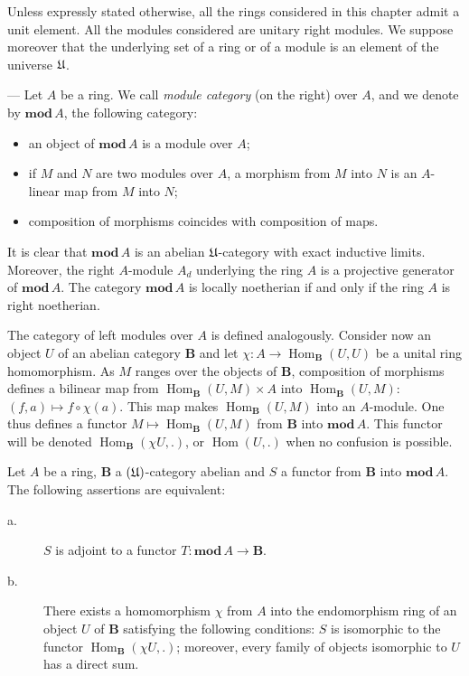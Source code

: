 Unless expressly stated otherwise, all the rings considered in this
chapter admit a unit element.  All the modules considered are unitary
right modules.  We suppose moreover that the underlying set of a ring
or of a module is an element of the universe $\mathfrak{U}$.

--- Let $A$ be a ring.  We call \emph{module category} (on the right)
over $A$, and we denote by $\mathbf{mod}\,A$, the following category:
\begin{itemize}
\item an object of $\mathbf{mod}\,A$ is a module over $A$;
\item if $M$ and $N$ are two modules over $A$, a morphism from $M$
      into $N$ is an $A$-linear map from $M$ into $N$;
\item composition of morphisms coincides with composition of maps.
\end{itemize}

It is clear that $\mathbf{mod}\,A$ is an abelian $\mathfrak{U}$-category with
exact inductive limits.  Moreover, the right $A$-module $A_d$
underlying the ring $A$ is a projective generator of
$\mathbf{mod}\,A$.  The category $\mathbf{mod}\,A$ is locally
noetherian if and only if the ring $A$ is right noetherian.

The category of left modules over $A$ is defined analogously.
Consider now an object $U$ of an abelian category $\mathbf B$ and let
$\chi\colon A\to\operatorname{Hom}_{\mathbf B}(U,U)$ be a unital ring
homomorphism.  As $M$ ranges over the objects of $\mathbf B$,
composition of morphisms defines a bilinear map from
$\operatorname{Hom}_{\mathbf B}(U,M)\times A$ into
$\operatorname{Hom}_{\mathbf B}(U,M)$:
$(f,a)\mapsto f\circ\chi(a)$.  This map makes
$\operatorname{Hom}_{\mathbf B}(U,M)$ into an $A$-module.  One thus
defines a functor $M\mapsto\operatorname{Hom}_{\mathbf B}(U,M)$ from
$\mathbf B$ into $\mathbf{mod}\,A$.  This functor will be denoted
$\operatorname{Hom}_{\mathbf B}(\chi U,.)$, or
$\operatorname{Hom}(U,.)$ when no confusion is possible.

\begin{proposition}
Let $A$ be a ring, $\mathbf B$ a $(\mathfrak{U})$-category abelian and $S$ a
functor from $\mathbf B$ into $\mathbf{mod}\,A$.  The following
assertions are equivalent:
\begin{description}
\item[\normalfont a.] $S$ is adjoint to a functor
      $T\colon\mathbf{mod}\,A\to\mathbf B$.
\item[\normalfont b.] There exists a homomorphism $\chi$ from $A$ into
      the endomorphism ring of an object $U$ of $\mathbf B$ satisfying
      the following conditions: $S$ is isomorphic to the functor
      $\operatorname{Hom}_{\mathbf B}(\chi U,.)$; moreover, every family
      of objects isomorphic to $U$ has a direct sum.
\end{description}
\end{proposition}

